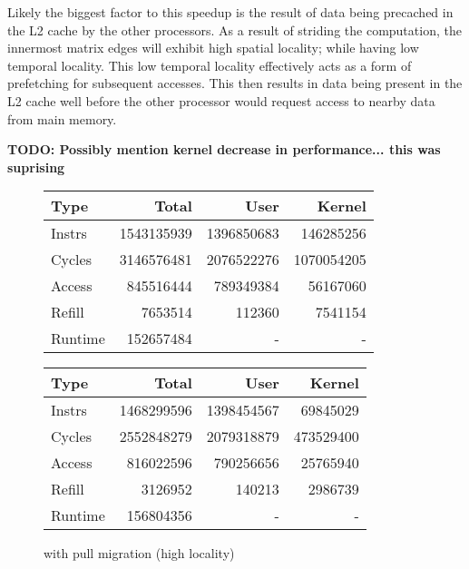 \documentclass[11pt]{article}
\begin{document}
Likely the biggest factor to this speedup is the result of data being precached in the L2 cache by the other processors.  As a result of striding the computation, the innermost matrix edges will exhibit high spatial locality; while having low temporal locality.  This low temporal locality effectively acts as a form of prefetching for subsequent accesses.  This then results in data being present in the L2 cache well before the other processor would request access to nearby data from main memory.  

\textbf{TODO: Possibly mention kernel decrease in performance... this was suprising}

\begin{figure*}[!h]
	\caption{60 threads consisting of 48 hard processes and 12 easy processes}	
	\centering
	\begin{subtable}{.48\linewidth}
		\centering                 
		\begin{tabular}{l|rrr}
			Type    & Total      & User       & Kernel     \\
			\hline
			Instrs  & 1543135939 & 1396850683 & 146285256  \\ 
			Cycles  & 3146576481 & 2076522276 & 1070054205 \\ 
			Access  & 845516444  & 789349384  & 56167060   \\ 
			Refill  & 7653514    & 112360     & 7541154    \\ 
			Runtime & 152657484  & -          & -          \\
			\hline 
		\end{tabular}
		\caption{without pull migration (high locality)}
	\end{subtable}
	\hfill
	\begin{subtable}{.48\linewidth}
		\begin{tabular}{l|rrr}
			Type    & Total      & User       & Kernel    \\
			\hline
			Instrs  & 1468299596 & 1398454567 & 69845029  \\ 
			Cycles  & 2552848279 & 2079318879 & 473529400 \\ 
			Access  & 816022596  & 790256656  & 25765940  \\ 
			Refill  & 3126952    & 140213     & 2986739   \\ 
			Runtime & 156804356  & -          & -         \\
			\hline
		\end{tabular}
		\caption{with pull migration (high locality)}
	\end{subtable}

\end{figure*}
\end{document}
